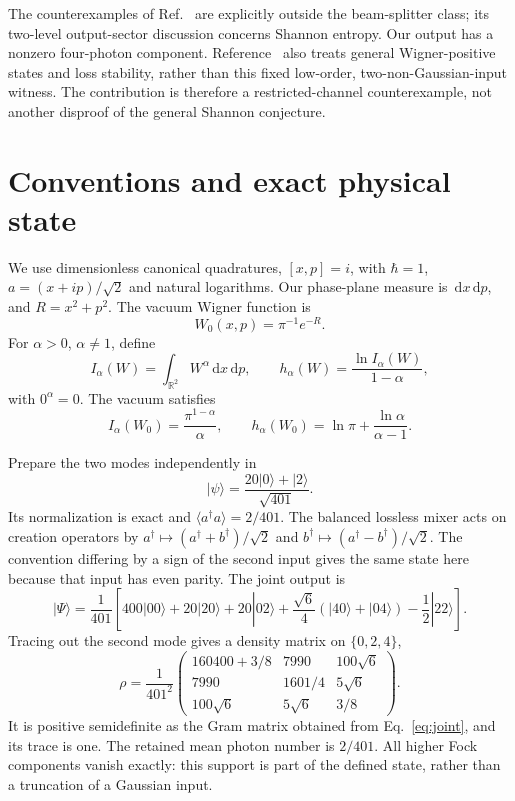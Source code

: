 \documentclass[11pt]{article}
\newcommand{\ket}[1]{|#1\rangle}
\newcommand{\dd}{\,\mathrm{d}}
\begin{document}
The counterexamples of Ref.~\cite{general} are explicitly outside the
beam-splitter class; its two-level output-sector discussion concerns Shannon
entropy. Our output has a nonzero four-photon component. Reference~\cite{he}
also treats general Wigner-positive states and loss stability, rather than this
fixed low-order, two-non-Gaussian-input witness.
The contribution is therefore a restricted-channel counterexample, not
another disproof of the general Shannon conjecture.

\section{Conventions and exact physical state}
We use dimensionless canonical quadratures, $[x,p]=i$, with $\hbar=1$,
$a=(x+ip)/\sqrt{2}$ and natural logarithms. Our phase-plane measure is
$\dd x\dd p$, and $R=x^2+p^2$. The vacuum Wigner function is
\begin{equation}
 W_0(x,p)=\pi^{-1}e^{-R}.
\end{equation}
For $\alpha>0$, $\alpha\neq1$, define
\begin{equation}
 I_\alpha(W)=\int_{\mathbb R^2}W^\alpha\dd x\dd p,\qquad
 h_\alpha(W)=\frac{\ln I_\alpha(W)}{1-\alpha},
 \label{eq:entropy}
\end{equation}
with $0^\alpha=0$. The vacuum satisfies
\begin{equation}
 I_\alpha(W_0)=\frac{\pi^{1-\alpha}}{\alpha},\qquad
 h_\alpha(W_0)=\ln\pi+\frac{\ln\alpha}{\alpha-1}.
 \label{eq:vac}
\end{equation}

Prepare the two modes independently in
\begin{equation}
 \ket{\psi}=\frac{20\ket{0}+\ket{2}}{\sqrt{401}}.
 \label{eq:input}
\end{equation}
Its normalization is exact and $\langle a^\dagger a\rangle=2/401$.
The balanced lossless mixer acts on creation operators by
$a^\dagger\mapsto(a^\dagger+b^\dagger)/\sqrt{2}$ and
$b^\dagger\mapsto(a^\dagger-b^\dagger)/\sqrt{2}$.
The convention differing by a sign of the second input gives the same
state here because that input has even parity. The joint output is
\begin{equation}
 \ket{\Psi}=\frac{1}{401}\left[
 400\ket{00}+20\ket{20}+20\ket{02}
 +\frac{\sqrt{6}}{4}(\ket{40}+\ket{04})-\frac12\ket{22}
 \right].
 \label{eq:joint}
\end{equation}
Tracing out the second mode gives a density matrix on $\{0,2,4\}$,
\begin{equation}
 \rho=\frac{1}{401^2}
 \begin{pmatrix}
 160400+3/8 & 7990 & 100\sqrt{6}\\
 7990 & 1601/4 & 5\sqrt{6}\\
 100\sqrt{6} & 5\sqrt{6} & 3/8
 \end{pmatrix}.
 \label{eq:rho}
\end{equation}
It is positive semidefinite as the Gram matrix obtained from
Eq.~\eqref{eq:joint}, and its trace is one. The retained mean photon number
is $2/401$. All higher Fock components vanish exactly: this support is
part of the defined state, rather than a truncation of a Gaussian input.
\end{document}
